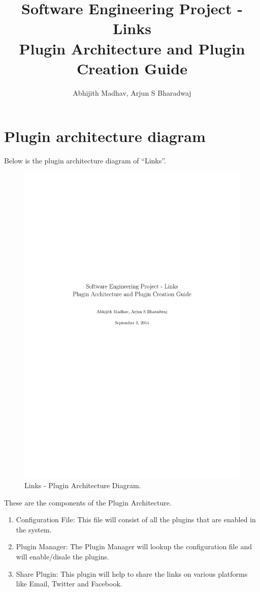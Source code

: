 \documentclass[11pt]{report} %
\title{Software Engineering Project - Links \\Plugin Architecture and Plugin Creation Guide}
\author{Abhijith Madhav, Arjun S Bharadwaj}
\begin{document}
\maketitle
\section*{Plugin architecture diagram}
Below is the plugin architecture diagram of ``Links''.
\begin{figure}[h]
\centering
        \includegraphics[width=\textwidth]{PluginArchitecture}
    \caption{{Links - Plugin Architecture Diagram}.}
    \label{fig:Plugin Architecture Diagram}
\end{figure}


These are the components of the Plugin Architecture.
\begin{enumerate}

\item
	Configuration File: This file will consist of all the plugins that are enabled in the system.
\item
	Plugin Manager: The Plugin Manager will lookup the configuration file and will enable/disale the plugins.
\item
	Share Plugin: This plugin will help to share the links on various platforms like Email, Twitter and Facebook.
\end{enumerate}
\end{document}
